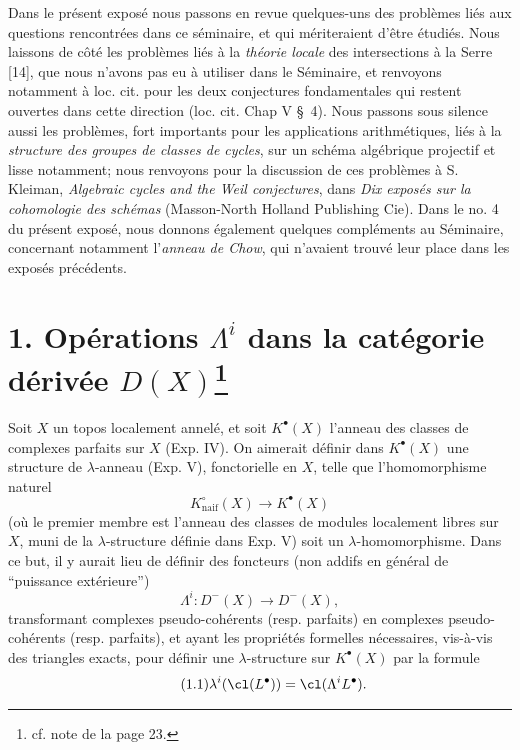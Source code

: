 Dans le présent exposé nous passons en revue quelques-uns des problèmes liés aux questions rencontrées dans ce séminaire, et qui mériteraient d'être étudiés. Nous laissons de côté les problèmes liés à la \emph{théorie locale} des intersections à la Serre [14], que nous n'avons pas eu à utiliser dans le Séminaire, et renvoyons notamment à loc. cit. pour les deux conjectures fondamentales qui restent ouvertes dans cette direction (loc. cit. Chap V \S~4). Nous passons sous silence aussi les problèmes, fort importants pour les applications arithmétiques, liés à la \emph{structure des groupes de classes de cycles}, sur un schéma algébrique projectif et lisse notamment; nous renvoyons pour la discussion de ces problèmes à S. Kleiman, \emph{Algebraic cycles and the Weil conjectures}, dans \emph{Dix exposés sur la cohomologie des schémas} (Masson-North Holland Publishing Cie). Dans le no. 4 du présent exposé, nous donnons également quelques compléments au Séminaire, concernant notamment l'\emph{anneau de Chow}, qui n'avaient trouvé leur place dans les exposés précédents.

\section*{1. Opérations $\Lambda^i$ dans la catégorie dérivée $D(X)$\footnote{cf. note de la page 23.}}

Soit $X$ un topos localement annelé, et soit $K^\bullet(X)$ l'anneau des classes de complexes parfaits sur $X$ (Exp. IV). On aimerait définir dans $K^\bullet(X)$ une structure de $\lambda$-anneau (Exp. V), fonctorielle en $X$, telle que l'homomorphisme naturel
\[
 K^\circ_{\mathrm{naif}}(X)\longrightarrow K^\bullet(X)
\]
(où le premier membre est l'anneau des classes de modules localement libres sur $X$, muni de la $\lambda$-structure définie dans Exp. V) soit un $\lambda$-homomorphisme. Dans ce but, il y aurait lieu de définir des foncteurs (non addifs en général de ``puissance extérieure'')
\[
 \Lambda^i:D^-(X)\longrightarrow D^-(X),
\]
transformant complexes pseudo-cohérents (resp. parfaits) en complexes pseudo-cohérents (resp. parfaits), et ayant les propriétés formelles nécessaires, vis-à-vis des triangles exacts, pour définir une $\lambda$-structure sur $K^\bullet(X)$ par la formule
\begin{equation}\tag{1.1}
 \lambda^i(\cl(L^\bullet))=\cl(\Lambda^i L^\bullet).
\end{equation}


